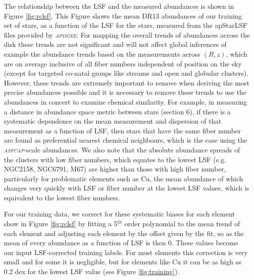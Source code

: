 \documentclass[14pt, preprint2]{aastex6}
\newcommand{\project}[1]{\textsl{#1}}
\newcommand{\apogee}{\project{\textsc{apogee}}}
\newcommand{\aspcap}{\project{\textsc{aspcap}}}
\begin{document}
The relationship between the LSF and the measured abundances is shown in Figure \ref{fig:rclsf}. This Figure shows the mean DR13 abundances of our training set of stars,  as a function of the LSF for the stars, measured from the apStarLSF files provided by \apogee. For mapping the overall trends of abundances across the disk these trends are not significant and will not affect global inferences of example the abundance trends based on the measurements across $(R,z)$, which are on average inclusive of all fiber numbers independent of position on the sky (except for targeted co-natal groups like streams and open and globular clusters). However, these trends are extremely important to remove when deriving the most precise abundances possible and it is necessary to remove these trends to use the abundances in concert to examine chemical similarity. For example, in measuring a distance in abundance space metric between stars (section 6), if there is a systematic dependence on the mean measurement and dispersion of that measurement as a function of LSF, then stars that have the same fiber number are found as preferential nearest chemical neighbours, which is the case using the \aspcap-scale abundances. We also note that the absolute abundance spreads of the clusters with low fiber numbers, which equates to the lowest LSF (e.g. NGC2158, NGC6791, M67) are higher than those with high fiber number,  particularly for problematic elements such as Cu, the mean abundance of which  changes very quickly with LSF or fiber number at the lowest LSF values, which is equivalent to the lowest fiber numbers. 

For our training data, we correct for these systematic biases for each element show in Figure \ref{fig:rclsf} by fitting a 5$^{th}$ order polynomial to the mean trend of each element and adjusting each element by the offset given by the fit, so as the mean of every abundance as a function of LSF is then 0. These values become our input LSF-corrected training labels.  For most elements this correction is very small and for some it is negligible, but for elements like Cu it can be as high as 0.2 dex for the lowest LSF value (see Figure \ref{fig:training}).
\end{document}
